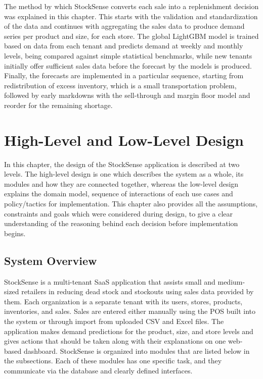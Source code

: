 \documentclass{StockSense}
\begin{document}
The method by which StockSense converts each sale into a replenishment decision was explained in this chapter. This starts with the validation and standardization of the data and continues with aggregating the sales data to produce demand series per product and size, for each store. The global LightGBM model is trained based on data from each tenant and predicts demand at weekly and monthly levels, being compared against simple statistical benchmarks, while new tenants initially offer sufficient sales data before the forecast by the models is produced. Finally, the forecasts are implemented in a particular sequence, starting from redistribution of excess inventory, which is a small transportation problem, followed by early markdowns with the sell-through and margin floor model and reorder for the remaining shortage.


\chapter{High-Level and Low-Level Design}

In this chapter, the design of the StockSense application is described at two levels. The high-level design is one which describes the system as a whole, its modules and how they are connected together, whereas the low-level design explains the domain model, sequence of interactions of each use cases and policy/tactics for implementation. This chapter also provides all the assumptions, constraints and goals which were considered during design, to give a clear understanding of the reasoning behind each decision before implementation begins.

\section{System Overview}

StockSense is a multi-tenant SaaS application that assists small and medium-sized retailers in reducing dead stock and stockouts using sales data provided by them. Each organization is a separate tenant with its users, stores, products, inventories, and sales. Sales are entered either manually using the POS built into the system or through import from uploaded CSV and Excel files. The application makes demand predictions for the product, size, and store levels and gives actions that should be taken along with their explanations on one web-based dashboard. StockSense is organized into modules that are listed below in the subsections. Each of these modules has one specific task, and they communicate via the database and clearly defined interfaces.
\end{document}
